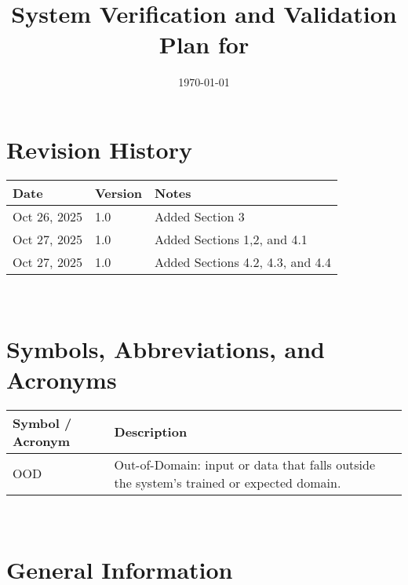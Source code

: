 \documentclass[12pt, titlepage]{article}
\begin{document}
\title{System Verification and Validation Plan for \progname{}} 
\author{\authname}
\date{\today}
	
\maketitle


\section*{Revision History}

\begin{tabularx}{\textwidth}{p{3cm}p{2cm}X}
\toprule {\bf Date} & {\bf Version} & {\bf Notes}\\
\midrule
Oct 26, 2025 & 1.0 & Added Section 3 \\
Oct 27, 2025 & 1.0 & Added Sections 1,2, and 4.1\\
Oct 27, 2025 & 1.0 & Added Sections 4.2, 4.3, and 4.4\\

\bottomrule
\end{tabularx}

~\\


\newpage

\tableofcontents

\listoftables


\newpage

\section{Symbols, Abbreviations, and Acronyms}

\renewcommand{\arraystretch}{1.2}
\begin{tabular}{l l} 
  \toprule		
  \textbf{Symbol / Acronym} & \textbf{Description}\\
  \midrule 
  OOD & Out-of-Domain: input or data that falls outside the system's trained or expected domain.\\
  \bottomrule
\end{tabular}\\

\newpage



\section{General Information}
\end{document}
